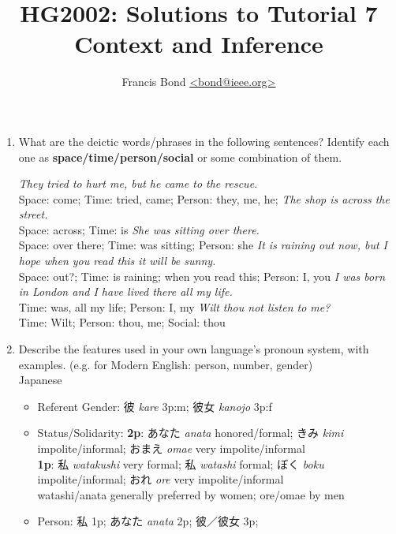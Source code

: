 \documentclass[a4paper]{article}
\title{\vspace*{-30mm}HG2002:   Solutions to Tutorial 7 \\  Context and Inference}
\author{Francis Bond \url{<bond@ieee.org>}}
\date{}%
\newcommand{\jpn}[1]{\textit{#1}}
\begin{document}
\maketitle

\begin{enumerate}

\item What are the deictic words/phrases in the following sentences?
  Identify each one as \textbf{space/time/person/social} or 
  some combination of them.

  \begin{exe}
    \ex \textit{They tried to hurt me, but he came to the rescue.}
    \\ Space: come; Time: tried, came; Person: they, me, he; 
    \ex \textit{The shop is across the street.}
    \\ Space:  across; Time: is
    \ex \textit{She was sitting over there.}
    \\ Space: over there; Time: was sitting; Person: she
    \ex \textit{It is raining out now, but I hope when you read this
      it will be sunny.}
    \\ Space: out?; Time: is raining; when you read this; Person: I, you
    \ex \textit{I was born in London and I have lived there all my
      life.}
    \\ Time: was, all my life; Person: I, my
    \ex \textit{Wilt thou not listen to me?}
    \\ Time: Wilt; Person: thou, me; Social: thou
  \end{exe}
\item Describe the features used in your own language's pronoun system, with examples.
  (e.g. for Modern English: person, number, gender)
\\ Japanese
  \begin{itemize}
  \item Referent Gender: 彼 \jpn{kare} 3p:m; 彼女 \jpn{kanojo} 3p:f
  \item Status/Solidarity: \textbf{2p}: あなた \jpn{anata} honored/formal;
  きみ \jpn{kimi} impolite/informal; おまえ \jpn{omae} very impolite/informal
  \\ \textbf{1p}: 私 \jpn{watakushi}  very formal;  私 \jpn{watashi}  formal;  ぼく
   \jpn{boku}  impolite/informal; おれ  \jpn{ore} very
   impolite/informal
   \\ watashi/anata generally preferred by women; ore/omae by men
\item Person: 私 1p; あなた \jpn{anata} 2p; 彼／彼女 3p;


\end{itemize}
\end{enumerate}
\end{document}

